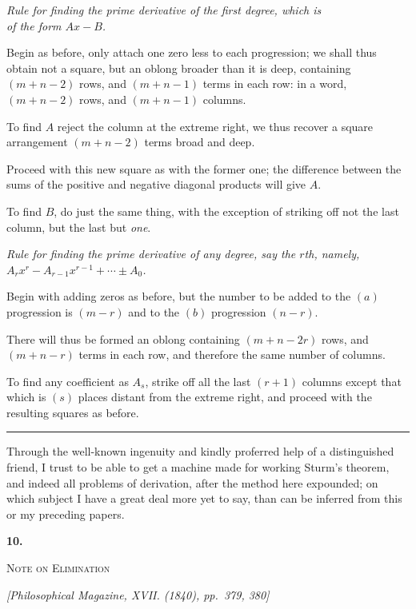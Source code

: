 \documentclass[11pt]{article}
\newcommand{\paperhead}[3]{%
  \clearpage
  \begin{center}
  {\Large\bfseries #1.}\par\vspace{0.85em}
  {\large\scshape #2}\par\vspace{0.6em}
  {\itshape [#3]}\par
  \end{center}\vspace{0.4em}}
\newcommand{\sourcepage}[1]{\marginpar{\scriptsize p.~#1}}
\begin{document}
\sourcepage{57}
\begin{center}\itshape Rule for finding the prime derivative of the first degree, which is\\ of the form $Ax-B$.\end{center}

Begin as before, only attach one zero less to each progression; we shall thus obtain not a square, but an oblong broader than it is deep, containing $(m+n-2)$ rows, and $(m+n-1)$ terms in each row: in a word, $(m+n-2)$ rows, and $(m+n-1)$ columns.

To find $A$ reject the column at the extreme right, we thus recover a square arrangement $(m+n-2)$ terms broad and deep.

Proceed with this new square as with the former one; the difference between the sums of the positive and negative diagonal products will give $A$.

To find $B$, do just the same thing, with the exception of striking off not the last column, but the last but \emph{one}.

\begin{center}\itshape Rule for finding the prime derivative of any degree, say the $r$th, namely,\\ $A_rx^r-A_{r-1}x^{r-1}+\cdots\pm A_0$.\end{center}

Begin with adding zeros as before, but the number to be added to the $(a)$ progression is $(m-r)$ and to the $(b)$ progression $(n-r)$.

There will thus be formed an oblong containing $(m+n-2r)$ rows, and $(m+n-r)$ terms in each row, and therefore the same number of columns.

To find any coefficient as $A_s$, strike off all the last $(r+1)$ columns except that which is $(s)$ places distant from the extreme right, and proceed with the resulting squares as before.

\bigskip
\begin{center}\rule{2.4in}{0.4pt}\end{center}
\bigskip

Through the well-known ingenuity and kindly proferred help of a distinguished friend, I trust to be able to get a machine made for working Sturm's theorem, and indeed all problems of derivation, after the method here expounded; on which subject I have a great deal more yet to say, than can be inferred from this or my preceding papers.

\paperhead{10}{Note on Elimination}{Philosophical Magazine, XVII. (1840), pp.~379, 380}
\end{document}
